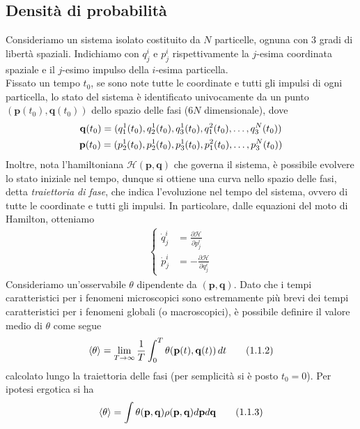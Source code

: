 \documentclass{article}
\begin{document}
\subsection{Densità di probabilità}
Consideriamo un sistema isolato costituito da $N$ particelle, ognuna con $3$ gradi di libertà spaziali. Indichiamo con $q^i_j$ e $p^i_j$ rispettivamente la $j$-esima coordinata spaziale e il $j$-esimo impulso della $i$-esima particella. \\
Fissato un tempo $t_0$, se sono note tutte le coordinate e tutti gli impulsi di ogni particella, lo stato del sistema è identificato univocamente da un punto $(\mathbf{p}(t_0), \mathbf{q}(t_0))$ dello spazio delle fasi ($6N$ dimensionale), dove
\begin{gather}
    \mathbf{q}(t_0) = (q^1_1(t_0), q^1_2(t_0), q^1_3(t_0), q^2_1(t_0), \dots, q^N_3(t_0)) \notag \\
    \mathbf{p}(t_0) = (p^1_2(t_0), p^1_2(t_0), p^1_3(t_0), p^2_1(t_0), \dots, p^N_3(t_0)) \notag
\end{gather}
Inoltre, nota l'hamiltoniana $\mathcal{H}(\mathbf{p}, \mathbf{q})$ che governa il sistema, è possibile evolvere lo stato iniziale nel tempo, dunque si ottiene una curva nello spazio delle fasi, detta \textit{traiettoria di fase}, che indica l'evoluzione nel tempo del sistema, ovvero di tutte le coordinate e tutti gli impulsi. In particolare, dalle equazioni del moto di Hamilton, otteniamo
\begin{gather}
    \begin{cases}
        \dot{q}^i_j &= \frac{\partial \mathcal{H}}{\partial p^i_j} \\
        \dot{p}^i_j &= -\frac{\partial \mathcal{H}}{\partial q^i_j}
    \end{cases} \tag{1.1.1}
\end{gather}
Consideriamo un'osservabile $\theta$ dipendente da $(\mathbf{p}, \mathbf{q})$. Dato che i tempi caratteristici per i fenomeni microscopici sono estremamente più brevi dei tempi caratteristici per i fenomeni globali (o macroscopici), è possibile definire il valore medio di $\theta$ come segue
\begin{gather}
    \braket{\theta} = \lim_{T \rightarrow \infty}\frac{1}{T}\int_0^T \theta(\mathbf{p}(t), \mathbf{q}(t)) \, dt \tag{1.1.2}
\end{gather}
calcolato lungo la traiettoria delle fasi (per semplicità si è posto $t_0 = 0$). Per ipotesi ergotica si ha
\begin{gather}
    \braket{\theta} = \int\theta(\mathbf{p}, \mathbf{q})\rho(\mathbf{p}, \mathbf{q})d\mathbf{p}d\mathbf{q} \tag{1.1.3}
\end{gather}
\end{document}
